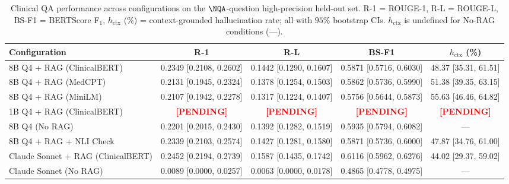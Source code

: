 \begin{table}[t]
\centering
\caption{Clinical QA performance across configurations on the
$\NQA$-question high-precision held-out set. R-1 = ROUGE-1,
R-L = ROUGE-L, BS-F1 = BERTScore F$_1$, $h_{\mathrm{ctx}}$ (\%) =
context-grounded hallucination rate; all with $95\%$ bootstrap CIs.
$h_{\mathrm{ctx}}$ is undefined for No-RAG conditions (---).}
\label{tab:qa_final}
\setlength{\tabcolsep}{5pt}
\begin{tabular}{@{}lcccc@{}}
\toprule
\textbf{Configuration} & \textbf{R-1} & \textbf{R-L} & \textbf{BS-F1} & \textbf{$h_{\mathrm{ctx}}$ (\%)} \\
\midrule
8B Q4 + RAG (ClinicalBERT) & 0.2349 [0.2108, 0.2602] & 0.1442 [0.1290, 0.1607] & 0.5871 [0.5716, 0.6030] & 48.37 [35.31, 61.51] \\
8B Q4 + RAG (MedCPT) & 0.2131 [0.1945, 0.2324] & 0.1378 [0.1254, 0.1503] & 0.5862 [0.5736, 0.5990] & 51.38 [39.35, 63.15] \\
8B Q4 + RAG (MiniLM) & 0.2107 [0.1942, 0.2278] & 0.1317 [0.1224, 0.1407] & 0.5756 [0.5644, 0.5873] & 55.63 [46.46, 64.82] \\
1B Q4 + RAG (ClinicalBERT) & \textcolor{red}{\textbf{[PENDING]}} & \textcolor{red}{\textbf{[PENDING]}} & \textcolor{red}{\textbf{[PENDING]}} & \textcolor{red}{\textbf{[PENDING]}} \\
8B Q4 (No RAG) & 0.2201 [0.2015, 0.2430] & 0.1392 [0.1282, 0.1519] & 0.5935 [0.5794, 0.6082] & --- \\
8B Q4 + RAG + NLI Check & 0.2339 [0.2103, 0.2574] & 0.1427 [0.1281, 0.1580] & 0.5871 [0.5736, 0.6000] & 47.87 [34.76, 61.00] \\
Claude Sonnet + RAG (ClinicalBERT) & 0.2452 [0.2194, 0.2739] & 0.1587 [0.1435, 0.1742] & 0.6116 [0.5962, 0.6276] & 44.02 [29.37, 59.02] \\
Claude Sonnet (No RAG) & 0.0089 [0.0000, 0.0257] & 0.0063 [0.0000, 0.0178] & 0.4865 [0.4778, 0.4975] & --- \\
\bottomrule
\end{tabular}
\end{table}

